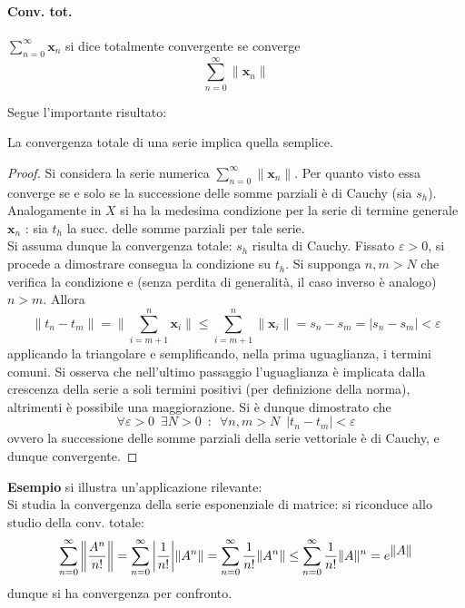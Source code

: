 \documentclass[10pt]{article}
\theoremstyle{plain}
\begin{document}
\paragraph*{Conv. tot.}
\begin{defin}
$\displaystyle \sum\limits_{n=0}^\infty \mathbf{x}_n$ si dice totalmente convergente se converge
\[\sum\limits_{n=0}^\infty \|\mathbf{x}_n\|\]
\end{defin}
Segue l'importante risultato:
\begin{prop}
La convergenza totale di una serie implica quella semplice.
\end{prop}
\begin{proof}
Si considera la serie numerica $\displaystyle \sum\limits_{n=0}^\infty \|\mathbf{x}_n\|$. Per quanto visto essa converge se e solo se la successione delle somme parziali è di Cauchy (sia $s_h$). Analogamente in $X$ si ha la medesima condizione per la serie di termine generale $\mathbf{x}_n$ : sia $t_h$ la succ. delle somme parziali per tale serie.
\\Si assuma dunque la convergenza totale: $s_h$ risulta di Cauchy. Fissato $\varepsilon >0$, si procede a dimostrare consegua la condizione su $t_h$. Si supponga $n, m > N$ che verifica la condizione e (senza perdita di generalità, il caso inverso è analogo) $n > m$. Allora
\[\|t_n - t_m\| = \|\sum\limits_{i=m+1}^{n} \mathbf{x}_i \| \leq  \sum\limits_{i=m+1}^{n} \|\mathbf{x}_i \| = s_n - s_m = |s_n - s_m| < \varepsilon\]
applicando la triangolare e semplificando, nella prima uguaglianza, i termini comuni. Si osserva che nell'ultimo passaggio l'uguaglianza è implicata dalla crescenza della serie a soli termini positivi (per definizione della norma), altrimenti è possibile una maggiorazione. Si è dunque dimostrato che
\[\forall \varepsilon > 0 \enspace \exists N > 0 \enspace : \enspace \forall n,m > N \enspace |t_n - t_m| < \varepsilon\]
ovvero la successione delle somme parziali della serie vettoriale è di Cauchy, e dunque convergente.
\end{proof}

\textbf{Esempio }si illustra un'applicazione rilevante:
\\Si studia la convergenza della serie esponenziale di matrice: si riconduce allo studio della conv. totale:
\[\sum\limits_{n=0}^\infty \bigg{\|}\frac{A^n}{n!}\bigg{\|} = \sum\limits_{n=0}^\infty\bigg|\frac{1}{n!}\bigg|\|A^n\| = \sum\limits_{n=0}^\infty\frac{1}{n!}\|A^n\| \leq \sum\limits_{n=0}^\infty\frac{1}{n!}\|A\|^n = e^{\displaystyle \|A\|}\]
dunque si ha convergenza per confronto.
\end{document}

